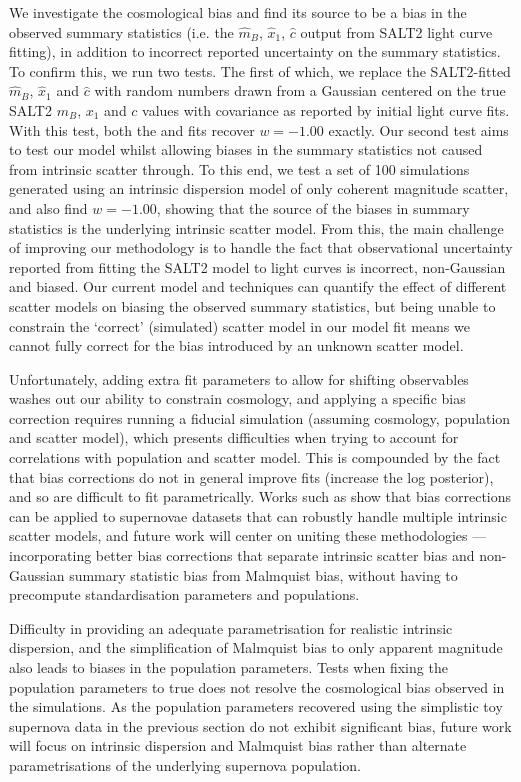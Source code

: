 \documentclass[a4paper,fleqn,usenatbib,manuscript]{emulateapj}
\newcommand{\gten}{\citetalias{Guy2010}}
\newcommand{\celeven}{\citetalias{Chotard2011}}
\begin{document}
We investigate the cosmological bias and find its source to be a bias in the observed summary statistics (i.e. the $\hat{m}_B$, $\hat{x}_1$, $\hat{c}$ output from SALT2 light curve fitting), in addition to incorrect reported uncertainty on the summary statistics. To confirm this, we run two tests. The first of which, we replace the SALT2-fitted $\hat{m}_B$, $\hat{x}_1$ and $\hat{c}$ with random numbers drawn from a Gaussian centered on the true SALT2 $m_B$, $x_1$ and $c$ values with covariance as reported by initial light curve fits. With this test, both the {\gten} and {\celeven} fits recover $w=-1.00$ exactly. Our second test aims to test our model whilst allowing biases in the summary statistics not caused from intrinsic scatter through. To this end, we test a set of 100 simulations generated using an intrinsic dispersion model of only coherent magnitude scatter, and also find $w=-1.00$, showing that the source of the biases in summary statistics is the underlying intrinsic scatter model. From this, the main challenge of improving our methodology is to handle the fact that observational uncertainty reported from fitting the SALT2 model to light curves is incorrect, non-Gaussian and biased. Our current model and techniques can quantify the effect of different scatter models on biasing the observed summary statistics, but being unable to constrain the `correct' (simulated) scatter model in our model fit means we cannot fully correct for the bias introduced by an unknown scatter model. 

Unfortunately, adding extra fit parameters to allow for shifting observables washes out our ability to constrain cosmology, and applying a specific bias correction requires running a fiducial simulation (assuming cosmology, population and scatter model), which presents difficulties when trying to account for correlations with population and scatter model. This is compounded by the fact that bias corrections do not in general improve fits (increase the log posterior), and so are difficult to fit parametrically. Works such as \citet{Kessler2017} show that bias corrections can be applied to supernovae datasets that can robustly handle multiple intrinsic scatter models, and future work will center on uniting these methodologies --- incorporating better bias corrections that separate intrinsic scatter bias and non-Gaussian summary statistic bias from Malmquist bias, without having to precompute standardisation parameters and populations.

Difficulty in providing an adequate parametrisation for realistic intrinsic dispersion, and the simplification of Malmquist bias to only apparent magnitude also leads to biases in the population parameters. Tests when fixing the population parameters to true does not resolve the cosmological bias observed in the {\celeven} simulations. As the population parameters recovered using the simplistic toy supernova data in the previous section do not exhibit significant bias, future work will focus on intrinsic dispersion and Malmquist bias rather than alternate parametrisations of the underlying supernova population.
\end{document}
